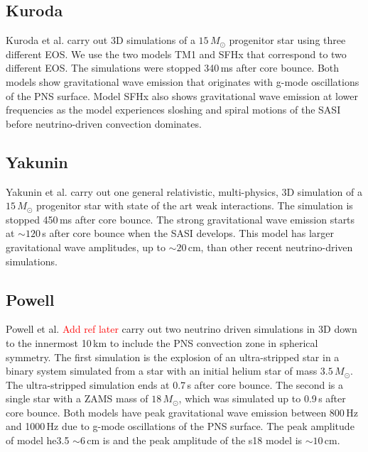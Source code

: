\documentclass[letterpaper, aps, prd, twocolumn, superscriptaddress, showpacs, nofootinbib]{revtex4}
\newcommand{\jade}{\textcolor{red}}
\begin{document}
\subsection{Kuroda}

Kuroda et al. \cite{kuroda:16} carry out 3D simulations of a $15\,M_{\odot}$ progenitor star using three different EOS. We use the two models TM1 and SFHx that correspond to two different EOS. The simulations were stopped 340\,ms after core bounce. Both models show gravitational wave emission that originates with g-mode oscillations of the PNS surface. Model SFHx also shows gravitational wave emission at lower frequencies as the model experiences sloshing and spiral motions of the SASI before neutrino-driven convection dominates.    

\subsection{Yakunin}

Yakunin et al. \cite{2017arXiv170107325Y} carry out one general relativistic, multi-physics, 3D simulation of a $15\,M_{\odot}$ progenitor star with state of the art weak interactions. The simulation is stopped 450\,ms after core bounce. The strong gravitational wave emission starts at $\sim120$\,s after core bounce when the SASI develops. This model has larger gravitational wave amplitudes, up to $\sim20$\,cm, than other recent neutrino-driven simulations. 

\subsection{Powell}

Powell et al. \jade{Add ref later} carry out two neutrino driven simulations in 3D down to the innermost 10\,km to include the PNS convection zone in spherical symmetry. The first simulation is the explosion of an ultra-stripped star in a binary system simulated from a star with an initial helium star of mass $3.5\,M_{\odot}$. The ultra-stripped simulation ends at 0.7\,s after core bounce. The second is a single star with a ZAMS mass of $18\,M_{\odot}$, which was simulated up to 0.9\,s after core bounce. Both models have peak gravitational wave emission between 800\,Hz and 1000\,Hz due to g-mode oscillations of the PNS surface. The peak amplitude of model he3.5 $\sim6$\,cm is and the peak amplitude of the s18 model is $\sim10$\,cm. 



\end{document}
